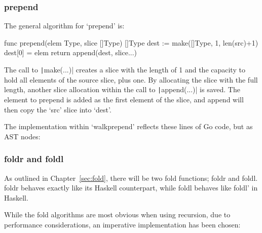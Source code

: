\begin{code}
\end{code}
\subsubsection{prepend}

The general algorithm for `prepend' is:
\begin{code}
    \begin{gocode}
func prepend(elem Type, slice []Type) []Type {
    dest := make([]Type, 1, len(src)+1)
    dest[0] = elem
    return append(dest, slice...)
}
    \end{gocode}
\end{code}
The call to \texttt|make(...)| creates a slice with the length of 1 and the capacity
to hold all elements of the source slice, plus one. By allocating the slice with the full
length, another slice allocation within the call to \texttt|append(...)| is saved.
The element to prepend is added as the first element of the slice, and append will then
copy the `src' slice into `dest'.

The implementation within `walkprepend' reflects these lines of Go code, but
as AST nodes:

\begin{code}
\end{code}
\subsubsection{foldr and foldl}

As outlined in Chapter~\ref{sec:fold}, there will be two fold functions;
foldr and foldl. foldr behaves exactly like its Haskell counterpart,
while foldl behaves like foldl' in Haskell.

While the fold algorithms are most obvious when using recursion, due to
performance considerations, an imperative implementation has been chosen:

